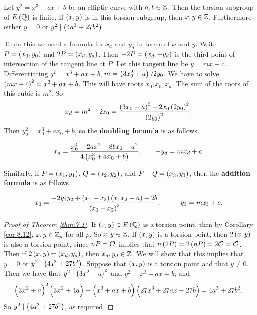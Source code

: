 \begin{theorem}
\label{thm:7.1}
Let $ y^2 = x^3 + ax + b $ be an elliptic curve with $ a, b \in \mathbb{Z} $. Then the torsion subgroup of $ E\br{\QQ} $ is finite. If $ \br{x, y} $ is in this torsion subgroup, then $ x, y \in \mathbb{Z} $. Furthermore either $ y = 0 $ or $ y^2 \mid \br{4a^3 + 27b^2} $.
\end{theorem}

To do this we need a formula for $ x_d $ and $ y_d $ in terms of $ x $ and $ y $. Write $ P = \br{x_0, y_0} $ and $ 2P = \br{x_d, y_d} $. Then $ -2P = \br{x_d, -y_d} $ is the third point of intersection of the tangent line at $ P $. Let this tangent line be $ y = mx + c $. Differentiating $ y^2 = x^3 + ax + b $, $ m = \br{3x_0^2 + a} / 2y_0 $. We have to solve $ \br{mx + c}^2 = x^3 + ax + b $. This will have roots $ x_0, x_0, x_d $. The sum of the roots of this cubic is $ m^2 $. So
$$ x_d = m^2 - 2x_0 = \dfrac{\br{3x_0 + a}^2 - 2x_0\br{2y_0}^2}{\br{2y_0}^2}. $$
Then $ y_0^2 = x_0^3 + ax_0 + b $, so the \textbf{doubling formula} is as follows.

\begin{algorithm}
$$ x_d = \dfrac{x_0^4 - 2ax^2 - 8bx_0 + a^2}{4\br{x_0^3 + ax_0 + b}}, \qquad -y_d = mx_d + c. $$
\end{algorithm}

Similarly, if $ P = \br{x_1, y_1} $, $ Q = \br{x_2, y_2} $, and $ P + Q = \br{x_3, y_3} $, then the \textbf{addition formula} is as follows.

\begin{algorithm}
$$ x_3 = \dfrac{-2y_1y_2 + \br{x_1 + x_2}\br{x_1x_2 + a} + 2b}{\br{x_1 - x_2}^2}, \qquad -y_3 = mx_3 + c. $$
\end{algorithm}

\begin{proof}[Proof of Theorem \ref{thm:7.1}]
If $ \br{x, y} \in E\br{\QQ} $ is a torsion point, then by Corollary \ref{cor:8.12}, $ x, y \in \mathbb{Z}_p $ for all $ p $. So $ x, y \in \mathbb{Z} $. If $ \br{x, y} $ is a torsion point, then $ 2\br{x, y} $ is also a torsion point, since $ nP = \mathcal{O} $ implies that $ n\br{2P} = 2\br{nP} = 2\OOO = \OOO $. Then if $ 2\br{x, y} = \br{x_d, y_d} $, then $ x_d, y_d \in \mathbb{Z} $. We will show that this implies that $ y = 0 $ or $ y^2 \mid \br{4a^3 + 27b^2} $. Suppose that $ \br{x, y} $ is a torsion point and that $ y \ne 0 $. Then we have that $ y^2 \mid \br{3x^2 + a}^2 $ and $ y^2 = x^3 + ax + b $, and
$$ \br{3x^2 + a}^2\br{3x^2 + 4a} - \br{x^3 + ax + b}\br{27x^3 + 27ax - 27b} = 4a^3 + 27b^2. $$
So $ y^2 \mid \br{4a^3 + 27b^2} $, as required.
\end{proof}

